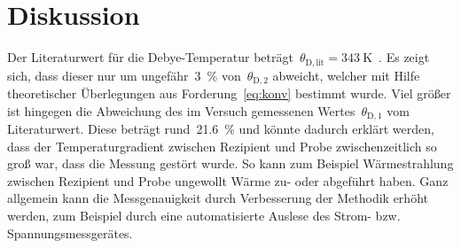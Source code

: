 \section{Diskussion}
\label{sec:diskussion}
%
Der Literaturwert für die Debye-Temperatur
beträgt~$\theta_{\mathrm{D,lit}}=\SI{343}{\kelvin}$~\cite{kittel}.
Es zeigt sich, dass dieser nur um ungefähr~\SI{3}{\percent}
von~$\theta_{\mathrm{D,2}}$ abweicht, welcher mit Hilfe theoretischer
Überlegungen aus Forderung~\eqref{eq:konv} bestimmt wurde.
Viel größer ist hingegen die Abweichung des im Versuch gemessenen
Wertes~$\theta_{\mathrm{D,1}}$ vom Literaturwert. Diese beträgt
rund~\SI{21.6}{\percent} und könnte dadurch erklärt werden, dass der
Temperaturgradient zwischen Rezipient und Probe zwischenzeitlich so groß war,
dass die Messung gestört wurde. So kann zum Beispiel Wärmestrahlung zwischen
Rezipient und Probe ungewollt Wärme zu- oder abgeführt haben. Ganz allgemein
kann die Messgenauigkeit durch Verbesserung der Methodik erhöht werden, zum
Beispiel durch eine automatisierte Auslese des Strom- bzw. Spannungsmessgerätes.
